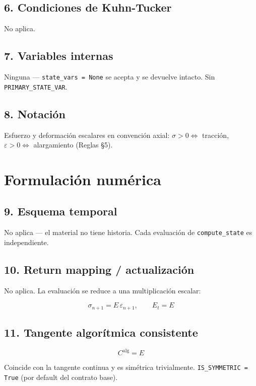 \documentclass[11pt,letterpaper,oneside]{report}
\begin{document}
\subsection{6. Condiciones de Kuhn-Tucker}

No aplica.

\subsection{7. Variables internas}

Ninguna --- \texttt{state\_vars = None} se acepta y se devuelve intacto. Sin \texttt{PRIMARY\_STATE\_VAR}.

\subsection{8. Notación}

Esfuerzo y deformación escalares en convención axial: $\sigma > 0 \Leftrightarrow$ tracción, $\varepsilon > 0 \Leftrightarrow$ alargamiento (Reglas §5).


\section{Formulación numérica}

\subsection{9. Esquema temporal}

No aplica --- el material no tiene historia. Cada evaluación de \texttt{compute\_state} es independiente.

\subsection{10. Return mapping / actualización}

No aplica. La evaluación se reduce a una multiplicación escalar:

\[
\sigma_{n+1} = E\,\varepsilon_{n+1}, \qquad E_t = E
\]

\subsection{11. Tangente algorítmica consistente}

\[
C^{\text{alg}} = E
\]

Coincide con la tangente continua y es simétrica trivialmente. \texttt{IS\_SYMMETRIC = True} (por default del contrato base).
\end{document}
